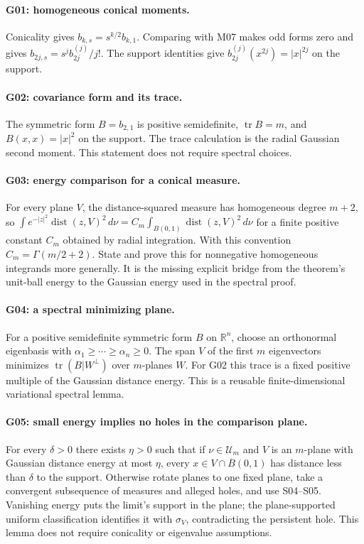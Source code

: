 \paragraph{G01: homogeneous conical moments.}
Conicality gives $b_{k,s}=s^{k/2}b_{k,1}$. Comparing with M07 makes odd forms
zero and gives $b_{2j,s}=s^j b_{2j}^{(j)}/j!$.
The support identities give $b_{2j}^{(j)}(x^{2j})=|x|^{2j}$ on the support.

\paragraph{G02: covariance form and its trace.}
The symmetric form $B=b_{2,1}$ is positive semidefinite,
$\operatorname{tr}B=m$, and $B(x,x)=|x|^2$ on the support.
The trace calculation is the radial Gaussian second moment. This statement
does not require spectral choices.

\paragraph{G03: energy comparison for a conical measure.}
For every plane $V$, the distance-squared measure has homogeneous degree
$m+2$, so
$\int e^{-|z|^2}\operatorname{dist}(z,V)^2\,d\nu
=C_m\int_{B(0,1)}\operatorname{dist}(z,V)^2\,d\nu$
for a finite positive constant $C_m$ obtained by radial integration.
With this convention $C_m=\Gamma(m/2+2)$.
State and prove this for nonnegative homogeneous integrands more generally.
It is the missing explicit bridge from the theorem's unit-ball energy to the
Gaussian energy used in the spectral proof.

\paragraph{G04: a spectral minimizing plane.}
For a positive semidefinite symmetric form $B$ on $\mathbb R^n$, choose an
orthonormal eigenbasis with $\alpha_1\geq\cdots\geq\alpha_n\geq0$.
The span $V$ of the first $m$ eigenvectors minimizes
$\operatorname{tr}(B|W^\perp)$ over $m$-planes $W$.
For G02 this trace is a fixed positive multiple of the Gaussian distance
energy. This is a reusable finite-dimensional variational spectral lemma.

\paragraph{G05: small energy implies no holes in the comparison plane.}
For every $\delta>0$ there exists $\eta>0$ such that if $\nu\in\mathcal U_m$
and $V$ is an $m$-plane with Gaussian distance energy at most $\eta$, every
$x\in V\cap\overline B(0,1)$ has distance less than $\delta$ to the support.
Otherwise rotate planes to one fixed plane, take a convergent subsequence of
measures and alleged holes, and use S04--S05. Vanishing energy puts the limit's
support in the plane; the plane-supported uniform classification identifies it
with $\sigma_V$, contradicting the persistent hole. This lemma does not
require conicality or eigenvalue assumptions.

